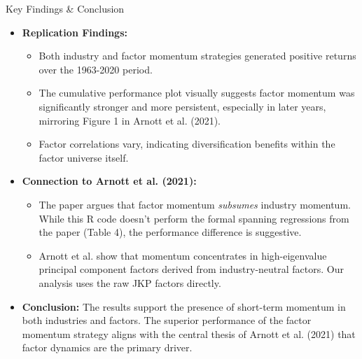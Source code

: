 \documentclass[t]{beamer}\usepackage[]{graphicx}\usepackage[table]{xcolor}
\begin{document}
\begin{frame}{Key Findings \& Conclusion}
\begin{itemize}
    \item \textbf{Replication Findings:}
        \begin{itemize}
            \item Both industry and factor momentum strategies generated positive returns over the 1963-2020 period.
            \item The cumulative performance plot visually suggests factor momentum was significantly stronger and more persistent, especially in later years, mirroring Figure 1 in Arnott et al. (2021).
            \item Factor correlations vary, indicating diversification benefits within the factor universe itself.
        \end{itemize}
    \item \textbf{Connection to Arnott et al. (2021):}
        \begin{itemize}
            \item The paper argues that factor momentum \textit{subsumes} industry momentum. While this R code doesn't perform the formal spanning regressions from the paper (Table 4), the performance difference is suggestive.
            \item Arnott et al. show that momentum concentrates in high-eigenvalue principal component factors derived from industry-neutral factors. Our analysis uses the raw JKP factors directly.
        \end{itemize}
     \item \textbf{Conclusion:} The results support the presence of short-term momentum in both industries and factors. The superior performance of the factor momentum strategy aligns with the central thesis of Arnott et al. (2021) that factor dynamics are the primary driver. %
\end{itemize}

\end{frame}
\end{document}
